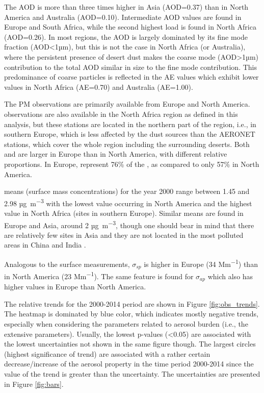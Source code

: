 \documentclass[acp, manuscript]{copernicus}
\begin{document}
The AOD is more than three times higher in Asia (AOD=0.37) than in North America and Australia (AOD=0.10). Intermediate AOD values are found in Europe and South Africa, while the second highest load is found in North Africa (AOD=0.26). In most regions, the AOD is largely dominated by its fine mode fraction (AOD<1µm), but this is not the case in North Africa (or Australia), where the persistent presence of desert dust makes the coarse mode (AOD>1µm) contribution to the total AOD similar in size to the fine mode contribution. This predominance of coarse particles is reflected in the AE values which exhibit lower values in North Africa (AE=0.70) and Australia (AE=1.00).

The PM observations are primarily available from Europe and North America.  observations are also available in the North Africa region as defined in this analysis, but these stations are  located in the northern part of the region, i.e., in southern Europe, which is less affected by the dust sources than the AERONET stations, which cover the whole region including the surrounding deserts. Both  and  are larger in Europe than in North America, with different relative proportions. In Europe,  represent 76\% of the , as compared to only 57\% in North America.

 means (surface mass concentrations) for the year 2000 range between 1.45 and 2.98 \unit{µg.m^{-3}} with the lowest value occurring in North America and the highest value in North Africa (sites in southern Europe). Similar means are found in Europe and Asia, around 2 \unit{µg.m^{-3}}, though one should bear in mind that there are relatively few sites in Asia and they are not located in the most polluted areas in China and India \citep{aas2019global}.

Analogous to the surface  measurements, $\sigma_{sp}$ is higher in Europe (34 \unit{Mm^{-1}}) than in North America (23 \unit{Mm^{-1}}). The same feature is found for $\sigma_{ap}$ which also has higher values in Europe than North America.



The relative trends for the 2000-2014 period are shown in Figure \ref{fig:obs_trends}. The heatmap is dominated by blue color, which indicates mostly negative trends, especially when considering the parameters related to aerosol burden (i.e., the extensive parameters). Usually, the lowest p-values (<0.05) are associated with the lowest uncertainties not shown in the same figure though. The largest circles (highest significance of trend) are associated with a rather certain decrease/increase of the aerosol property in the time period 2000-2014 since the value of the trend is greater than the uncertainty. The uncertainties are presented in Figure \ref{fig:bars}.
\end{document}
